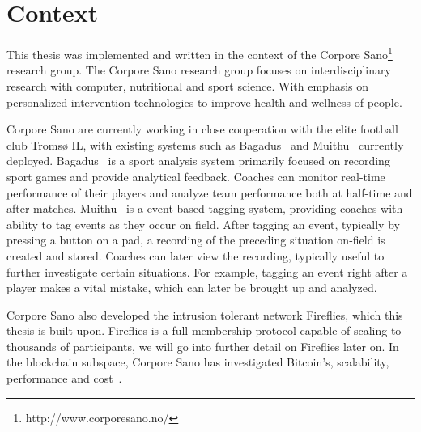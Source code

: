 \documentclass[USenglish]{uit-thesis}
\begin{document}
\section{Context}
This thesis was implemented and written in the context of the Corpore Sano\footnote{http://www.corporesano.no/} research group.
The Corpore Sano research group focuses on interdisciplinary research with computer, nutritional and sport science.
With emphasis on personalized intervention technologies to improve health and wellness of people.
    
Corpore Sano are currently working in close cooperation with the elite football club Tromsø IL, with existing systems such as Bagadus~\cite{baga, baga2, baga3} and Muithu~\cite{mui, mui2} currently deployed.
Bagadus~\cite{baga, baga2, baga3} is a sport analysis system primarily focused on recording sport games and provide analytical feedback.
Coaches can monitor real-time performance of their players and analyze team performance both at half-time and after matches.
Muithu~\cite{mui, mui2} is a event based tagging system, providing coaches with ability to tag events as they occur on field.
After tagging an event, typically by pressing a button on a pad, a recording of the preceding situation on-field is created and stored.
Coaches can later view the recording, typically useful to further investigate certain situations.
For example, tagging an event right after a player makes a vital mistake, which can later be brought up and analyzed.


Corpore Sano also developed the intrusion tolerant network Fireflies, which this thesis is built upon.
Fireflies is a full membership protocol capable of scaling to thousands of participants, we will go into further detail on Fireflies later on.
In the blockchain subspace, Corpore Sano has investigated Bitcoin's, scalability, performance and cost~\cite{teddy, teddy2}.
  
  
\end{document}
